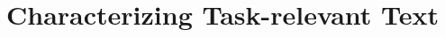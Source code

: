 \setcounter{chapter}{2}


\chapter{Characterizing Task-relevant Text}
\label{ch:characterizing}



\clearpage

